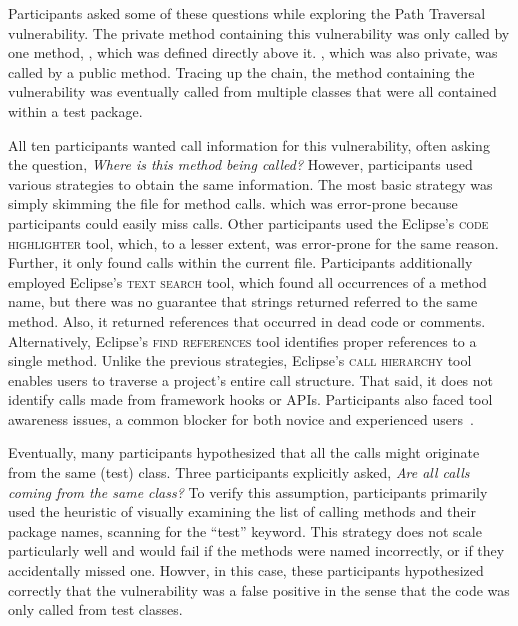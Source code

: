 \documentclass{acm_proc_article-sp}
\begin{document}
 
Participants asked some of these questions while exploring the Path Traversal vulnerability.
The private method containing this vulnerability was only called by one method, , which was defined directly above it. , which was also private, was called by a public method. Tracing up the chain, the method containing the vulnerability was eventually called from multiple classes that were all contained within a test package.

All ten participants wanted call information for this vulnerability, often asking the question, \textit{Where is this method being called?} 
However, participants used various strategies to obtain the same information.
The most basic strategy was simply skimming the file for method calls. which was error-prone because participants could easily miss calls.
Other participants used the Eclipse's \textsc{code highlighter} tool, which, to a lesser extent, was error-prone for the same reason. Further, it only found calls within the current file.
Participants additionally employed Eclipse's \textsc{text search} tool, which found all occurrences of a method name, but there was no guarantee that strings returned referred to the same method. 
Also, it returned references that occurred in dead code or comments.
Alternatively, Eclipse's \textsc{find references} tool identifies proper references to a single method.
Unlike the previous strategies, Eclipse's \textsc{call hierarchy} tool enables users to traverse a project's entire call structure.
That said, it does not identify calls made from framework hooks or APIs.
Participants also faced tool awareness issues, a common blocker for both novice and experienced users~\cite{murphy-Hill2012fluency}.

Eventually, many participants hypothesized that all the calls might originate from the same (test) class. 
Three participants explicitly asked, \textit{Are all calls coming from the same class?} 
To verify this assumption, participants primarily used the heuristic of visually examining the list of calling methods and their package names, scanning for the ``test'' keyword.
This strategy does not scale particularly well and would fail if the methods were named incorrectly, or if they accidentally missed one.
Howver, in this case, these participants hypothesized correctly that the vulnerability was a false positive in the sense that the code was only called from test classes.


\end{document}
